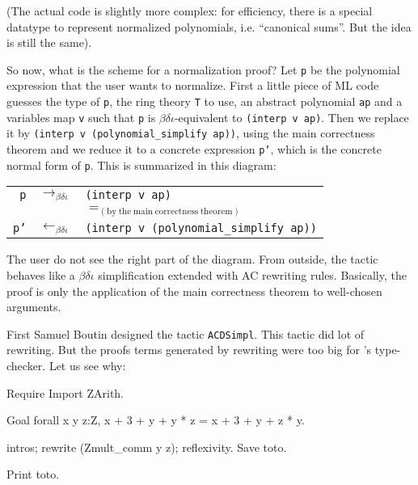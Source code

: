 (The actual code is slightly more complex: for efficiency,
there is a special datatype to represent normalized polynomials,
i.e. ``canonical sums''. But the idea is still the same).

So now, what is the scheme for a normalization proof? Let \texttt{p}
be the polynomial expression that the user wants to normalize. First a
little piece of ML code guesses the type of \texttt{p}, the ring
theory \texttt{T} to use, an abstract polynomial \texttt{ap} and a
variables map \texttt{v} such that \texttt{p} is
$\beta\delta\iota$-equivalent to \verb|(interp v ap)|. Then we
replace it by \verb|(interp v (polynomial_simplify ap))|, using the
main correctness theorem and we reduce it to a concrete expression
\texttt{p'}, which is the concrete normal form of
\texttt{p}. This is summarized in this diagram:

\medskip
\begin{tabular}{rcl}
\texttt{p} & $\rightarrow_{\beta\delta\iota}$  
   & \texttt{(interp v ap)} \\
 & & $=_{\mathrm{(by\ the\ main\ correctness\ theorem)}}$ \\
\texttt{p'} 
   & $\leftarrow_{\beta\delta\iota}$ 
   & \texttt{(interp v (polynomial\_simplify ap))}
\end{tabular}
\medskip

The user do not see the right part of the diagram. 
From outside, the tactic behaves like a
$\beta\delta\iota$ simplification extended with AC rewriting rules.
Basically, the proof is only the application of the main
correctness theorem to well-chosen arguments.


First Samuel Boutin designed the tactic \texttt{ACDSimpl}. 
This tactic did lot of rewriting. But the proofs
terms generated by rewriting were too big for \Coq's type-checker.
Let us see why:

\begin{coq_eval}
Require Import ZArith.
\end{coq_eval}
\begin{coq_example}
Goal forall x y z:Z, x + 3 + y + y * z = x + 3 + y + z * y.
\end{coq_example}
\begin{coq_example*}
intros; rewrite (Zmult_comm y z); reflexivity.
Save toto.
\end{coq_example*}
\begin{coq_example}
Print  toto.
\end{coq_example}

